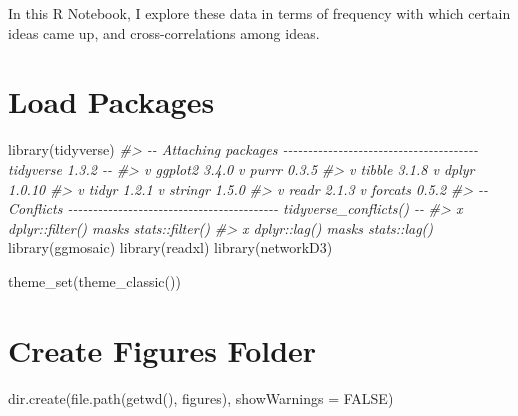 \documentclass[
]{article}
\newenvironment{Shaded}{\begin{snugshade}}{\end{snugshade}}
\newcommand{\AttributeTok}[1]{\textcolor[rgb]{0.77,0.63,0.00}{#1}}
\newcommand{\CommentTok}[1]{\textcolor[rgb]{0.56,0.35,0.01}{\textit{#1}}}
\newcommand{\ConstantTok}[1]{\textcolor[rgb]{0.00,0.00,0.00}{#1}}
\newcommand{\FunctionTok}[1]{\textcolor[rgb]{0.00,0.00,0.00}{#1}}
\newcommand{\NormalTok}[1]{#1}
\newcommand{\StringTok}[1]{\textcolor[rgb]{0.31,0.60,0.02}{#1}}
\begin{document}
In this R Notebook, I explore these data in terms of frequency with
which certain ideas came up, and cross-correlations among ideas.

\hypertarget{load-packages}{%
\section{Load Packages}\label{load-packages}}

\begin{Shaded}
\begin{Highlighting}[]
\FunctionTok{library}\NormalTok{(tidyverse)}
\CommentTok{\#\textgreater{} {-}{-} Attaching packages {-}{-}{-}{-}{-}{-}{-}{-}{-}{-}{-}{-}{-}{-}{-}{-}{-}{-}{-}{-}{-}{-}{-}{-}{-}{-}{-}{-}{-}{-}{-}{-}{-}{-}{-}{-}{-}{-}{-} tidyverse 1.3.2 {-}{-}}
\CommentTok{\#\textgreater{} v ggplot2 3.4.0      v purrr   0.3.5 }
\CommentTok{\#\textgreater{} v tibble  3.1.8      v dplyr   1.0.10}
\CommentTok{\#\textgreater{} v tidyr   1.2.1      v stringr 1.5.0 }
\CommentTok{\#\textgreater{} v readr   2.1.3      v forcats 0.5.2 }
\CommentTok{\#\textgreater{} {-}{-} Conflicts {-}{-}{-}{-}{-}{-}{-}{-}{-}{-}{-}{-}{-}{-}{-}{-}{-}{-}{-}{-}{-}{-}{-}{-}{-}{-}{-}{-}{-}{-}{-}{-}{-}{-}{-}{-}{-}{-}{-}{-}{-}{-} tidyverse\_conflicts() {-}{-}}
\CommentTok{\#\textgreater{} x dplyr::filter() masks stats::filter()}
\CommentTok{\#\textgreater{} x dplyr::lag()    masks stats::lag()}
\FunctionTok{library}\NormalTok{(ggmosaic)}
\FunctionTok{library}\NormalTok{(readxl)}
\FunctionTok{library}\NormalTok{(networkD3)}

\FunctionTok{theme\_set}\NormalTok{(}\FunctionTok{theme\_classic}\NormalTok{())}
\end{Highlighting}
\end{Shaded}

\hypertarget{create-figures-folder}{%
\section{Create Figures Folder}\label{create-figures-folder}}

\begin{Shaded}
\begin{Highlighting}[]
\FunctionTok{dir.create}\NormalTok{(}\FunctionTok{file.path}\NormalTok{(}\FunctionTok{getwd}\NormalTok{(), }\StringTok{\textquotesingle{}figures\textquotesingle{}}\NormalTok{), }\AttributeTok{showWarnings =} \ConstantTok{FALSE}\NormalTok{)}
\end{Highlighting}
\end{Shaded}
\end{document}
